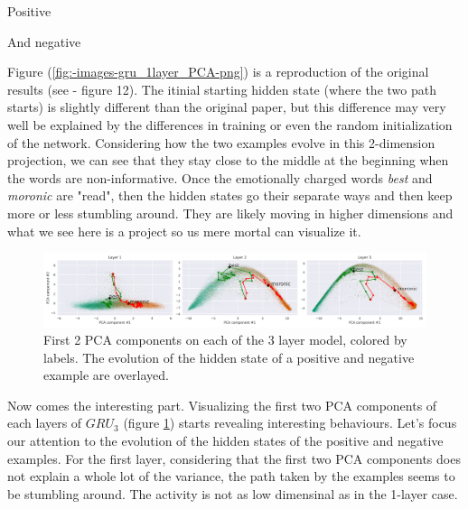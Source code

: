 \documentclass{article}
\begin{document}
Positive

And negative

Figure (\ref{fig:-images-gru_1layer_PCA-png}) is a reproduction of the original results (see \cite{maheswaranathan2019reverse} - figure 12). The itinial starting hidden state (where the two path starts) is slightly different than the original paper, but this difference may very well be explained by the differences in training or even the random initialization of the network. Considering how the two examples evolve in this 2-dimension projection, we can see that they stay close to the middle at the beginning when the words are non-informative. Once the emotionally charged words \textit{best} and \textit{moronic} are "read", then the hidden states go their separate ways and then keep more or less stumbling around. They are likely moving in higher dimensions and what we see here is a project so us mere mortal can visualize it. 

\begin{figure}[H]
  \centering
  \includegraphics[width=1\textwidth]{../images/gru_3layer_100_PCA.png}
  \caption{
    First 2 PCA components on each of the 3 layer model, colored by labels. 
    The evolution of the hidden state of a positive and negative example are overlayed.
  }
  \label{fig:-images-gru_3layer_PCA-png}
\end{figure}  

Now comes the interesting part. Visualizing the first two PCA components of each layers of $GRU_3$ (figure \ref{fig:-images-gru_3layer_PCA-png}) starts revealing interesting behaviours. Let's focus our attention to the evolution of the hidden states of the positive and negative examples. For the first layer, considering that the first two PCA components does not explain a whole lot of the variance, the path taken by the examples seems to be stumbling around. The activity is not as low dimensinal as in the 1-layer case.
\end{document}
